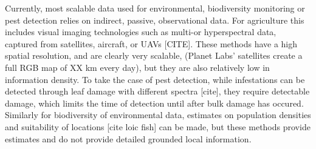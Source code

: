 %

Currently, most scalable data used for environmental, biodiversity monitoring or pest detection relies on indirect, passive, observational data. For agriculture this includes visual imaging technologies such as multi-or hyperspectral data, captured from satellites, aircraft, or UAVs [CITE]. 
These methods have a high spatial resolution, and  are clearly very scalable, (Planet Labs' satellites create a full RGB map of XX km every day), but they are also relatively low in information density.  To take the case of pest detection, while infestations can be detected through leaf damage with different spectra [cite], they require detectable damage, which limits the time of detection until after bulk damage has occured. Similarly for biodiversity of environmental data, estimates on population densities and suitability of locations [cite loic fish] can be made, but these methods provide estimates and do not provide detailed grounded local information. 



